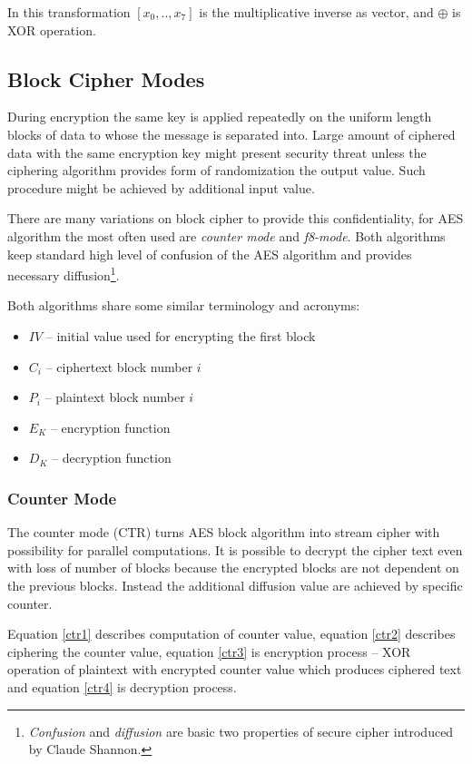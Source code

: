In this transformation $[x_0, .., x_7]$ is the multiplicative inverse as vector,
and $\oplus$ is XOR operation.

\subsection{Block Cipher Modes}
During encryption the same key is applied repeatedly on the uniform length 
blocks of data to whose the message is separated into. Large amount of ciphered 
data with the same encryption key might present security threat unless the 
ciphering algorithm provides form of randomization the output value. Such 
procedure might be achieved by additional input value.

There are many variations on block cipher to provide this confidentiality\cite{
blockciphers}, for AES algorithm the most often used are \textit{counter 
mode} and \textit{f8-mode}. Both algorithms keep standard high level of 
confusion of the AES algorithm and provides necessary diffusion\footnote{
\textit{Confusion} and \textit{diffusion} are basic two properties of secure 
cipher introduced by Claude Shannon\cite{shannon}.}.

Both algorithms share some similar terminology and acronyms:
\begin{itemize}
\item $IV$ -- initial value used for encrypting the first block
\item $C_i$ -- ciphertext block number $i$
\item $P_i$ -- plaintext block number $i$
\item $E_K$ -- encryption function
\item $D_K$ -- decryption function
\end{itemize}

\subsubsection*{Counter Mode}
The counter mode (CTR) turns AES block algorithm into stream cipher with 
possibility for parallel computations\cite{parallelctr}. It is possible to 
decrypt the cipher text even with loss of number of blocks because the encrypted
blocks are not dependent on the previous blocks. Instead the additional 
diffusion value are achieved by specific counter. 

Equation \ref{ctr1} describes computation of counter value, equation \ref{ctr2}
describes ciphering the counter value, equation \ref{ctr3} is encryption process
-- XOR operation of plaintext with encrypted counter value which produces 
ciphered text and equation \ref{ctr4} is decryption process.

